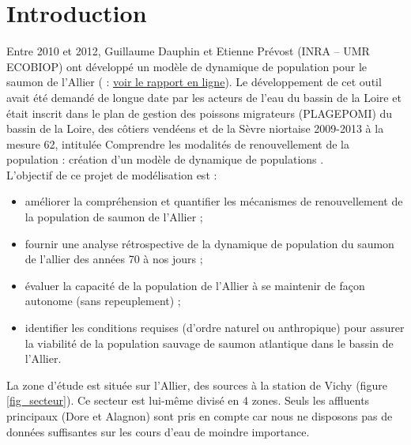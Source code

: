 \documentclass[a4paper,12pt]{report}
\begin{document}







\tableofcontents
\newpage
\listoffigures
\newpage
\listoftables
\newpage

\sffamily
\chapter{Introduction}

Entre 2010 et 2012, Guillaume Dauphin et Etienne Prévost (INRA -- UMR ECOBIOP)
ont développé un modèle de dynamique de population pour le saumon de l'Allier
(\citet{dauphin_viability_2013} : \href{http://www.plan-loire.fr/fileadmin/pce/PF_RDI/ProjetsRecherche/Docs/INRA_viabilite_saumon/33698_Rapport_final_viabilite_Saumon_Allier.pdf}{voir
le rapport en ligne}). Le développement de cet outil avait été
demandé de longue date par les acteurs de l'eau du bassin de la Loire 
et était inscrit dans le plan de gestion des poissons migrateurs (PLAGEPOMI) du bassin de la Loire, des côtiers vendéens et de la Sèvre niortaise 2009-2013 à la mesure 62, intitulée \og Comprendre les modalités de renouvellement de la population : création d'un modèle de dynamique de populations \fg{}.\\
L'objectif de ce projet de modélisation est :
\begin{itemize}
  \item améliorer  la  compréhension  et  quantifier  les  mécanismes  de 
  renouvellement  de  la population de saumon de l'Allier ;
  \item fournir une analyse rétrospective de la dynamique de population du
  saumon de l'allier des années 70 à nos jours ;
  \item  évaluer la capacité de la population de l'Allier à se maintenir de
  façon autonome (sans repeuplement) ;
  \item  identifier  les  conditions  requises  (d'ordre  naturel  ou 
  anthropique)  pour  assurer  la viabilité de la population \og sauvage \fg{} de
  saumon atlantique dans le bassin de l'Allier.
\end{itemize}
La zone d'étude est située sur l'Allier, des sources à la station de Vichy
(figure \ref{fig_secteur}). Ce secteur est lui-même divisé en 4 zones. Seuls les
affluents principaux (Dore et Alagnon) sont pris en compte car nous ne disposons pas de
données suffisantes sur les cours d'eau de moindre importance.
\end{document}
